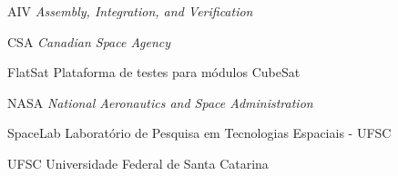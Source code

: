 
\begin{siglas}
  \item[ AIV ] \emph{Assembly, Integration, and Verification}
  \item[ CSA ] \textit{Canadian Space Agency}
  \item[ FlatSat ] Plataforma de testes para módulos CubeSat
  \item[ NASA ] \textit{National Aeronautics and Space Administration}
  \item[ SpaceLab ] Laboratório de Pesquisa em Tecnologias Espaciais - UFSC
  \item[ UFSC ] Universidade Federal de Santa Catarina
\end{siglas}